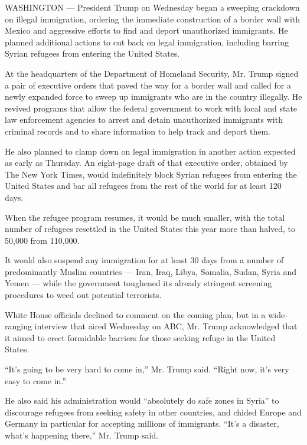 WASHINGTON --- President Trump on Wednesday began a sweeping crackdown
on illegal immigration, ordering the immediate construction of a border
wall with Mexico and aggressive efforts to find and deport unauthorized
immigrants. He planned additional actions to cut back on legal
immigration, including barring Syrian refugees from entering the United
States.

At the headquarters of the Department of Homeland Security, Mr. Trump
signed a pair of executive orders that paved the way for a border wall
and called for a newly expanded force to sweep up immigrants who are in
the country illegally. He revived programs that allow the federal
government to work with local and state law enforcement agencies to
arrest and detain unauthorized immigrants with criminal records and to
share information to help track and deport them.

He also planned to clamp down on legal immigration in another action
expected as early as Thursday. An eight-page draft of that executive
order, obtained by The New York Times, would indefinitely block Syrian
refugees from entering the United States and bar all refugees from the
rest of the world for at least 120 days.

When the refugee program resumes, it would be much smaller, with the
total number of refugees resettled in the United States this year more
than halved, to 50,000 from 110,000.

It would also suspend any immigration for at least 30 days from a number
of predominantly Muslim countries --- Iran, Iraq, Libya, Somalia, Sudan,
Syria and Yemen --- while the government toughened its already stringent
screening procedures to weed out potential terrorists.

White House officials declined to comment on the coming plan, but in a
wide-ranging interview that aired Wednesday on ABC, Mr. Trump
acknowledged that it aimed to erect formidable barriers for those
seeking refuge in the United States.

``It's going to be very hard to come in,'' Mr. Trump said. ``Right now,
it's very easy to come in.''

He also said his administration would ``absolutely do safe zones in
Syria'' to discourage refugees from seeking safety in other countries,
and chided Europe and Germany in particular for accepting millions of
immigrants. ``It's a disaster, what's happening there,'' Mr. Trump said.

\href{https://www.nytimes.com/interactive/2017/01/25/us/politics/document-Trump-EO-Draft-on-Refugees.html}{}

